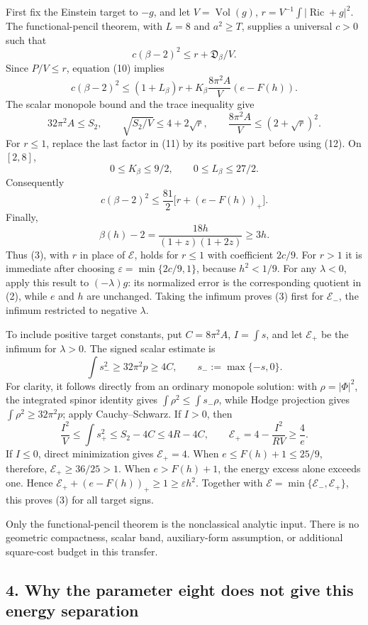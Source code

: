 \documentclass[
  10pt,
]{article}
\begin{document}
First fix the Einstein target to \(-g\), and let
\(V=\operatorname{Vol}(g)\), \(r=V^{-1}\int|\operatorname{Ric}+g|^2\).
The functional-pencil theorem, with \(L=8\) and \(a^2\ge T\), supplies a
universal \(c>0\) such that \[
 c(\beta-2)^2\le r+\mathfrak D_\beta/V.
\] Since \(P/V\le r\), equation (10) implies \[
 c(\beta-2)^2
 \le (1+L_\beta)r+
 K_\beta\frac{8\pi^2A}{V}(e-F(h)).
 \tag{11}
\] The scalar monopole bound and the trace inequality give \[
 32\pi^2A\le S_2,\qquad
 \sqrt{S_2/V}\le4+2\sqrt r,
 \qquad \frac{8\pi^2A}{V}\le(2+\sqrt r)^2.
 \tag{12}
\] For \(r\le1\), replace the last factor in (11) by its positive part
before using (12). On \([2,8]\), \[
 0\le K_\beta\le9/2,\qquad 0\le L_\beta\le27/2.
\] Consequently \[
 c(\beta-2)^2\le\frac{81}{2}\bigl[r+(e-F(h))_+\bigr].
 \tag{13}
\] Finally, \[
 \beta(h)-2
 =\frac{18h}{(1+z)(1+2z)}\ge3h.
\] Thus (3), with \(r\) in place of \(\mathcal E\), holds for \(r\le1\)
with coefficient \(2c/9\). For \(r>1\) it is immediate after choosing
\(\varepsilon=\min\{2c/9,1\}\), because \(h^2<1/9\). For any
\(\lambda<0\), apply this result to \((-\lambda)g\): its normalized
error is the corresponding quotient in (2), while \(e\) and \(h\) are
unchanged. Taking the infimum proves (3) first for \(\mathcal E_-\), the
infimum restricted to negative \(\lambda\).

To include positive target constants, put \(C=8\pi^2A\), \(I=\int s\),
and let \(\mathcal E_+\) be the infimum for \(\lambda>0\). The signed
scalar estimate is \[
 \int s_-^2\ge32\pi^2p\ge4C,\qquad s_-:=\max\{-s,0\}.
 \tag{14}
\] For clarity, it follows directly from an ordinary monopole solution:
with \(\rho=|\Phi|^2\), the integrated spinor identity gives
\(\int\rho^2\le\int s_-\rho\), while Hodge projection gives
\(\int\rho^2\ge32\pi^2p\); apply Cauchy--Schwarz. If \(I>0\), then \[
 \frac{I^2}{V}\le\int s_+^2\le S_2-4C\le4R-4C,
 \qquad \mathcal E_+=4-\frac{I^2}{RV}\ge\frac4e.
\] If \(I\le0\), direct minimization gives \(\mathcal E_+=4\). When
\(e\le F(h)+1\le25/9\), therefore, \(\mathcal E_+\ge36/25>1\). When
\(e>F(h)+1\), the energy excess alone exceeds one. Hence
\(\mathcal E_++(e-F(h))_+\ge1\ge\varepsilon h^2\). Together with
\(\mathcal E=\min\{\mathcal E_-,\mathcal E_+\}\), this proves (3) for
all target signs.

Only the functional-pencil theorem is the nonclassical analytic input.
There is no geometric compactness, scalar band, auxiliary-form
assumption, or additional square-cost budget in this transfer.

\hypertarget{why-the-parameter-eight-does-not-give-this-energy-separation}{%
\subsection{4. Why the parameter eight does not give this energy
separation}\label{why-the-parameter-eight-does-not-give-this-energy-separation}}
\end{document}

